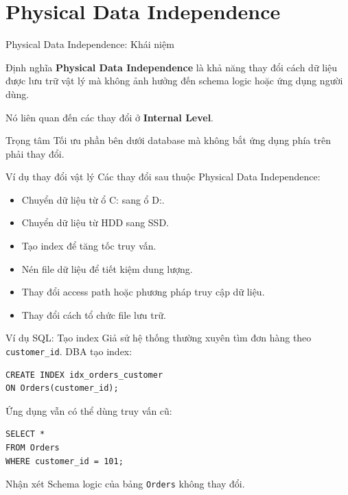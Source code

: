 \documentclass[aspectratio=169,11pt]{beamer}
\begin{document}
\section{Physical Data Independence}

\begin{frame}{Physical Data Independence: Khái niệm}
\begin{block}{Định nghĩa}
\textbf{Physical Data Independence} là khả năng thay đổi cách dữ liệu được lưu trữ vật lý mà không ảnh hưởng đến schema logic hoặc ứng dụng người dùng.
\end{block}

\vspace{0.3cm}
Nó liên quan đến các thay đổi ở \textbf{Internal Level}.

\vspace{0.3cm}
\begin{alertblock}{Trọng tâm}
Tối ưu phần bên dưới database mà không bắt ứng dụng phía trên phải thay đổi.
\end{alertblock}
\end{frame}

\begin{frame}{Ví dụ thay đổi vật lý}
Các thay đổi sau thuộc Physical Data Independence:
\begin{itemize}
  \item Chuyển dữ liệu từ ổ C: sang ổ D:.
  \item Chuyển dữ liệu từ HDD sang SSD.
  \item Tạo index để tăng tốc truy vấn.
  \item Nén file dữ liệu để tiết kiệm dung lượng.
  \item Thay đổi access path hoặc phương pháp truy cập dữ liệu.
  \item Thay đổi cách tổ chức file lưu trữ.
\end{itemize}
\end{frame}

\begin{frame}[fragile]{Ví dụ SQL: Tạo index}
Giả sử hệ thống thường xuyên tìm đơn hàng theo \texttt{customer\_id}. DBA tạo index:

\begin{lstlisting}[style=sqlstyle]
CREATE INDEX idx_orders_customer
ON Orders(customer_id);
\end{lstlisting}

Ứng dụng vẫn có thể dùng truy vấn cũ:

\begin{lstlisting}[style=sqlstyle]
SELECT *
FROM Orders
WHERE customer_id = 101;
\end{lstlisting}

\begin{alertblock}{Nhận xét}
Schema logic của bảng \texttt{Orders} không thay đổi.
\end{alertblock}
\end{frame}
\end{document}
